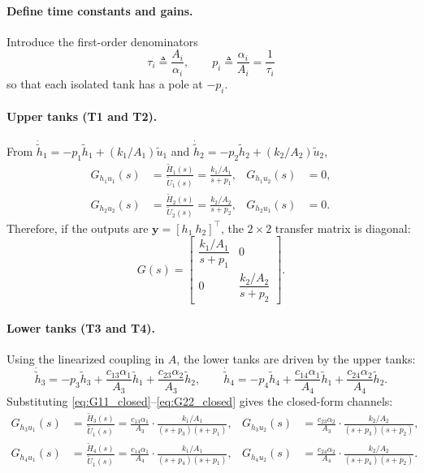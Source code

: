\documentclass[11pt]{article}
\begin{document}
\paragraph{Define time constants and gains.}
Introduce the first-order denominators
\[
\tau_i \triangleq \frac{A_i}{\alpha_i},\qquad
p_i \triangleq \frac{\alpha_i}{A_i} = \frac{1}{\tau_i}
\]
so that each isolated tank has a pole at \(-p_i\).

\paragraph{Upper tanks (T1 and T2).}
From \(\dot{\tilde{h}}_1 = -p_1\tilde{h}_1 + (k_1/A_1)\tilde{u}_1\) and
\(\dot{\tilde{h}}_2 = -p_2\tilde{h}_2 + (k_2/A_2)\tilde{u}_2\),
\begin{align}
G_{h_1 u_1}(s) &= \frac{\tilde{H}_1(s)}{\tilde{U}_1(s)} =
\frac{k_1/A_1}{s + p_1},
&G_{h_1 u_2}(s) &= 0,
\label{eq:G11_closed}\\
G_{h_2 u_2}(s) &= \frac{\tilde{H}_2(s)}{\tilde{U}_2(s)} =
\frac{k_2/A_2}{s + p_2},
&G_{h_2 u_1}(s) &= 0.
\label{eq:G22_closed}
\end{align}
Therefore, if the outputs are \(\bm{y}=[h_1\ h_2]^\top\), the \(2\times 2\) transfer matrix is diagonal:
\[
G(s)=
\begin{bmatrix}
\dfrac{k_1/A_1}{s+p_1} & 0\\[10pt]
0 & \dfrac{k_2/A_2}{s+p_2}
\end{bmatrix}.
\]

\paragraph{Lower tanks (T3 and T4).}
Using the linearized coupling in \(A\), the lower tanks are driven by the upper tanks:
\[
\dot{\tilde{h}}_3 = -p_3 \tilde{h}_3 + \frac{c_{13}\alpha_1}{A_3}\tilde{h}_1 + \frac{c_{23}\alpha_2}{A_3}\tilde{h}_2,\qquad
\dot{\tilde{h}}_4 = -p_4 \tilde{h}_4 + \frac{c_{14}\alpha_1}{A_4}\tilde{h}_1 + \frac{c_{24}\alpha_2}{A_4}\tilde{h}_2.
\]
Substituting \eqref{eq:G11_closed}--\eqref{eq:G22_closed} gives the closed-form channels:
\begin{align}
G_{h_3 u_1}(s) &= \frac{\tilde{H}_3(s)}{\tilde{U}_1(s)} =
\frac{c_{13}\alpha_1}{A_3}\cdot\frac{k_1/A_1}{(s+p_3)(s+p_1)},
&
G_{h_3 u_2}(s) &=
\frac{c_{23}\alpha_2}{A_3}\cdot\frac{k_2/A_2}{(s+p_3)(s+p_2)},
\label{eq:G31G32_closed}\\
G_{h_4 u_1}(s) &= \frac{\tilde{H}_4(s)}{\tilde{U}_1(s)} =
\frac{c_{14}\alpha_1}{A_4}\cdot\frac{k_1/A_1}{(s+p_4)(s+p_1)},
&
G_{h_4 u_2}(s) &=
\frac{c_{24}\alpha_2}{A_4}\cdot\frac{k_2/A_2}{(s+p_4)(s+p_2)}.
\label{eq:G41G42_closed}
\end{align}
\end{document}
